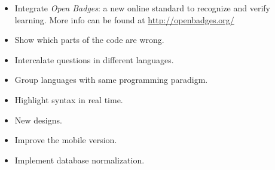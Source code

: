 \begin{itemize}
\item Integrate \textit{Open Badges}: a new online standard to recognize and verify learning. More info can be found at \url{http://openbadges.org/}

\item Show which parts of the code are wrong.

\item Intercalate questions in different languages.

\item Group languages with same programming paradigm.

\item Highlight syntax in real time.

\item New designs.

\item Improve the mobile version.

\item Implement database normalization.

\end{itemize}